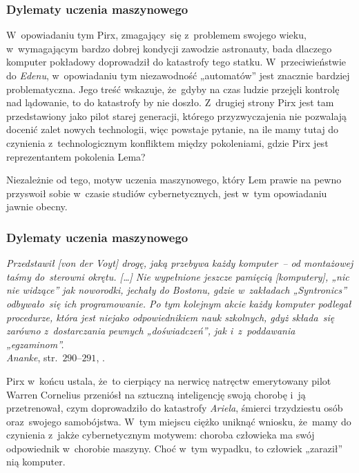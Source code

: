 \documentclass[10pt,t]{beamer}
\begin{document}
\begin{frame}
  \frametitle{Dylematy uczenia maszynowego}


  W~opowiadaniu tym Pirx, zmagający~się z~problemem swojego wieku,
  w~wymagającym bardzo dobrej kondycji zawodzie astronauty, bada
  dlaczego komputer pokładowy doprowadził do katastrofy tego statku.
  W~przeciwieństwie do \textit{Edenu}, w~opowiadaniu tym niezawodność
  „automatów” jest znacznie bardziej problematyczna. Jego treść
  wskazuje, że~gdyby na czas ludzie przejęli kontrolę nad lądowanie, to do
  katastrofy by nie doszło. Z~drugiej strony Pirx jest tam przedstawiony
  jako pilot starej generacji, którego przyzwyczajenia nie pozwalają
  docenić zalet nowych technologii, więc powstaje pytanie, na ile mamy
  tutaj do czynienia z~technologicznym konfliktem między pokoleniami,
  gdzie Pirx jest reprezentantem pokolenia Lema?

  Niezależnie od tego, motyw uczenia maszynowego, który Lem prawie na pewno
  przyswoił sobie w~czasie studiów cybernetycznych, jest w~tym opowiadaniu
  jawnie obecny.

\end{frame}





\begin{frame}
  \frametitle{Dylematy uczenia maszynowego}


  \textit{Przedstawił [von der Voyt] drogę, jaką przebywa każdy komputer~--
    od montażowej taśmy do~sterowni okrętu. [\ldots] Nie wypełnione jeszcze
    pamięcią [komputery], „nic nie widzące” jak noworodki, jechały do
    Bostonu, gdzie w~zakładach „Syntronics” odbywało~się ich programowanie.
    Po tym kolejnym akcie każdy komputer podlegał procedurze, która jest
    niejako odpowiednikiem nauk szkolnych, gdyż składa~się zarówno
    z~dostarczania pewnych „doświadczeń”, jak i~z~poddawania
    „egzaminom”.} \\
  \textit{Ananke}, str.~$290\text{--}291$,
  \parencite{Lem-Ogrod-ciemnosci-i-inne-opowiadania-Pub-2017}.

  Pirx w~końcu ustala, że~to cierpiący na nerwicę natręctw emerytowany
  pilot Warren Cornelius przeniósł na sztuczną inteligencję swoją chorobę
  i~ją przetrenował, czym doprowadziło do katastrofy \textit{Ariela},
  śmierci trzydziestu osób oraz~swojego samobójstwa. W~tym miejscu
  ciężko uniknąć wniosku, że~mamy do czynienia z~jakże cybernetycznym
  motywem: choroba człowieka ma swój odpowiednik w~chorobie maszyny.
  Choć w~tym wypadku, to człowiek „zaraził” nią komputer.

\end{frame}
\end{document}
